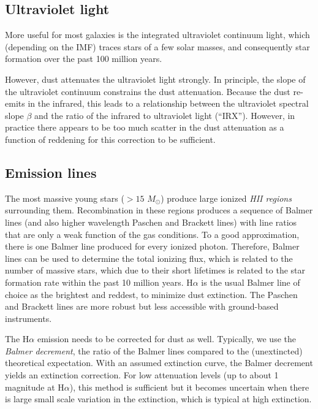 \subsection{Ultraviolet light}

More useful for most galaxies is the integrated ultraviolet continuum
light, which (depending on the IMF) traces stars of a few solar
masses, and consequently star formation over the past 100 million
years.

However, dust attenuates the ultraviolet light strongly. In principle,
the slope of the ultraviolet continuum constrains the dust
attenuation. Because the dust re-emits in the infrared, this leads to
a relationship between the ultraviolet spectral slope $\beta$ and the
ratio of the infrared to ultraviolet light (``IRX''). However, in
practice there appears to be too much scatter in the dust attenuation
as a function of reddening for this correction to be sufficient. 

\subsection{Emission lines}

The most massive young stars ($>15$ $M_\odot$) produce large ionized
{\it HII regions} surrounding them. Recombination in these regions
produces a sequence of Balmer lines (and also higher wavelength
Paschen and Brackett lines) with line ratios that are only a weak
function of the gas conditions. To a good approximation, there is one
Balmer line produced for every ionized photon. Therefore, Balmer lines
can be used to determine the total ionizing flux, which is related to
the number of massive stars, which due to their short lifetimes is
related to the star formation rate within the past 10 million
years. H$\alpha$ is the usual Balmer line of choice as the brightest
and reddest, to minimize dust extinction. The Paschen and Brackett
lines are more robust but less accessible with ground-based
instruments.

The H$\alpha$ emission needs to be corrected for dust as well.
Typically, we use the {\it Balmer decrement}, the ratio of the Balmer
lines compared to the (unextincted) theoretical expectation. With an
assumed extinction curve, the Balmer decrement yields an extinction
correction. For low attenuation levels (up to about 1 magnitude at
H$\alpha$), this method is sufficient but it becomes uncertain when
there is large small scale variation in the extinction, which is
typical at high extinction.


